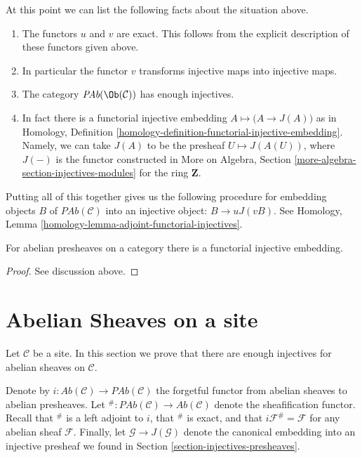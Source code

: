\medskip\noindent
At this point we can list the following facts
about the situation above.
\begin{enumerate}
\item The functors $u$ and $v$ are exact. This follows from
the explicit description of these functors given above.
\item In particular the functor $v$ transforms injective maps
into injective maps.
\item The category $\textit{PAb}(\Ob(\mathcal{C}))$
has enough injectives.
\item In fact there is a functorial injective embedding
$A \mapsto \big(A \to J(A)\big)$ as in
Homology, Definition \ref{homology-definition-functorial-injective-embedding}.
Namely, we can take $J(A)$ to be the
presheaf $U\mapsto J(A(U))$, where
$J(-)$ is the functor constructed in
More on Algebra, Section \ref{more-algebra-section-injectives-modules}
for the ring $\mathbf{Z}$.
\end{enumerate}
Putting all of this together gives us the following procedure
for embedding objects $B$ of $\textit{PAb}(\mathcal{C})$ into
an injective object: $B \to uJ(vB)$. See
Homology, Lemma \ref{homology-lemma-adjoint-functorial-injectives}.

\begin{proposition}
\label{proposition-presheaves-injectives}
For abelian presheaves on a category there is a functorial injective
embedding.
\end{proposition}

\begin{proof}
See discussion above.
\end{proof}












\section{Abelian Sheaves on a site}
\label{section-injectives-sheaves}

\noindent
Let $\mathcal{C}$ be a site. In this section we prove that there are
enough injectives for abelian sheaves on $\mathcal{C}$.

\medskip\noindent
Denote by
$i : \textit{Ab}(\mathcal{C}) \longrightarrow \textit{PAb}(\mathcal{C})$
the forgetful functor from abelian sheaves to abelian presheaves.
Let
${}^\# : \textit{PAb}(\mathcal{C}) \longrightarrow \textit{Ab}(\mathcal{C})$
denote the sheafification functor. Recall that ${}^\#$ is a left adjoint
to $i$, that ${}^\#$ is exact, and that $i\mathcal{F}^\# = \mathcal{F}$
for any abelian sheaf $\mathcal{F}$. Finally, let
$\mathcal{G} \to J(\mathcal{G})$ denote the canonical
embedding into an injective presheaf we found in
Section \ref{section-injectives-presheaves}.

